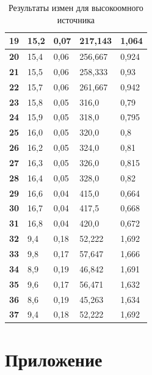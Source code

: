 \documentclass[14pt, a4paper, twoside]{extreport}
\begin{document}
\begin{table}[H]
\begin{tabular}{|l|l|l|l|l|}
    \textbf{19} & 15,2 & 0,07 & 217,143   & 1,064     \\ \hline
    \textbf{20} & 15,4 & 0,06 & 256,667   & 0,924     \\ \hline
    \textbf{21} & 15,5 & 0,06 & 258,333   & 0,93      \\ \hline
    \textbf{22} & 15,7 & 0,06 & 261,667   & 0,942     \\ \hline
    \textbf{23} & 15,8 & 0,05 & 316,0     & 0,79      \\ \hline
    \textbf{24} & 15,9 & 0,05 & 318,0     & 0,795     \\ \hline
    \textbf{25} & 16,0 & 0,05 & 320,0     & 0,8       \\ \hline
    \textbf{26} & 16,2 & 0,05 & 324,0     & 0,81      \\ \hline
    \textbf{27} & 16,3 & 0,05 & 326,0     & 0,815     \\ \hline
    \textbf{28} & 16,4 & 0,05 & 328,0     & 0,82      \\ \hline
    \textbf{29} & 16,6 & 0,04 & 415,0     & 0,664     \\ \hline
    \textbf{30} & 16,7 & 0,04 & 417,5     & 0,668     \\ \hline
    \textbf{31} & 16,8 & 0,04 & 420,0     & 0,672     \\ \hline
    \textbf{32} & 9,4  & 0,18 & 52,222    & 1,692     \\ \hline
    \textbf{33} & 9,8  & 0,17 & 57,647    & 1,666     \\ \hline
    \textbf{34} & 8,9  & 0,19 & 46,842    & 1,691     \\ \hline
    \textbf{35} & 9,6  & 0,17 & 56,471    & 1,632     \\ \hline
    \textbf{36} & 8,6  & 0,19 & 45,263    & 1,634     \\ \hline
    \textbf{37} & 9,4  & 0,18 & 52,222    & 1,692     \\ \hline
  \end{tabular}
  \caption{Результаты измен для высокоомного источника}
  \label{tab:highoms}
\end{table}

\chapter{Приложение \thechapter}
\label{chp:lowohms}
\end{document}
